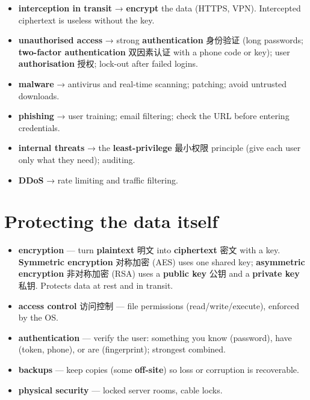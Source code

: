\documentclass[11pt]{article}
\begin{document}
\begin{itemize}
\item \textbf{interception in transit} → \textbf{encrypt} the data (HTTPS, VPN). Intercepted ciphertext is useless without the key.

\item \textbf{unauthorised access} → strong \textbf{authentication} 身份验证 (long passwords; \textbf{two-factor authentication} 双因素认证 with a phone code or key); user \textbf{authorisation} 授权; lock-out after failed logins.

\item \textbf{malware} → antivirus and real-time scanning; patching; avoid untrusted downloads.

\item \textbf{phishing} → user training; email filtering; check the URL before entering credentials.

\item \textbf{internal threats} → the \textbf{least-privilege} 最小权限 principle (give each user only what they need); auditing.

\item \textbf{DDoS} → rate limiting and traffic filtering.

\end{itemize}

\section*{Protecting the data itself}

\begin{itemize}
\item \textbf{encryption} — turn \textbf{plaintext} 明文 into \textbf{ciphertext} 密文 with a key. \textbf{Symmetric encryption} 对称加密 (AES) uses one shared key; \textbf{asymmetric encryption} 非对称加密 (RSA) uses a \textbf{public key} 公钥 and a \textbf{private key} 私钥. Protects data at rest and in transit.

\item \textbf{access control} 访问控制 — file permissions (read/write/execute), enforced by the OS.

\item \textbf{authentication} — verify the user: something you know (password), have (token, phone), or are (fingerprint); strongest combined.

\item \textbf{backups} — keep copies (some \textbf{off-site}) so loss or corruption is recoverable.

\item \textbf{physical security} — locked server rooms, cable locks.

\end{itemize}
\end{document}
